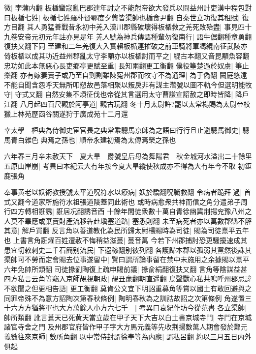 微|{
	孛蒲内翻}
板楯蠻寇亂巴郡連年討之不能尅帝欲大發兵以問益州計吏漢中程包對曰板楯七姓|{
	板楯七姓羅朴督鄂度夕龔皆渠帥也楯食尹翻}
自秦世立功復其租賦|{
	復方目翻}
其人勇猛善戰昔永初中羌入漢川郡縣破壞得板楯救之羌死敗殆盡|{
	事見四十九卷安帝元初元年註亦見是年}
羌人號為神兵傳語種輩勿復南行|{
	語牛倨翻種章勇翻復扶又翻下同}
至建和二年羌復大入實賴板楯連摧破之前車騎將軍馮緄南征武陵亦倚板楯以成其功近益州郡亂太守李顒亦以板楯討而平之|{
	緄古本翻又音昆顒魚容翻}
忠功如此本無惡心長吏鄉亭更賦至重|{
	長知兩翻更工衡翻}
僕役箠楚過於奴虜|{
	箠止橤翻}
亦有嫁妻賣子或乃至自剄割雖陳寃州郡而牧守不為通理|{
	為于偽翻}
闕庭悠遠不能自聞含怨呼天無所叩愬故邑落相聚以叛戾非有謀主濳號以圖不軌今但選明能牧守|{
	守式又翻}
自然安集不煩征伐也帝從其言選用太守曹謙宣詔赦之即時皆降|{
	降戶江翻}
八月起四百尺觀於阿亭道|{
	觀古玩翻}
冬十月太尉許?罷以太常楊賜為太尉帝校獵上林苑歷函谷關遂狩于廣成苑十二月還

幸太學　桓典為侍御史宦官畏之典常乘驄馬京師為之語曰行行且止避驄馬御史|{
	驄馬青白雜色}
典焉之孫也|{
	順帝永建初焉為太傳焉榮之孫也}


六年春三月辛未赦天下　夏大旱　爵號皇后母為舞陽君　秋金城河水溢出二十餘里　五原山岸崩|{
	考異曰本紀云大冇年按今夏大旱縱使秋成亦不得為大冇年今不取}
初鉅鹿張角

奉事黄老以妖術教授號太平道呪符水以療病|{
	妖於驕翻呪職救翻}
令病者跪拜過|{
	首式又翻今道家所施符水祖張道陵蓋同此術也}
或時病愈衆共神而信之角分遣弟子周行四方轉相誑誘|{
	誑居况翻誘音酉}
十餘年間徒衆數十萬自青徐幽冀荆揚兖豫八州之人莫不畢應或棄賣財產流移犇赴塡塞道路|{
	塞悉則翻}
未至病死者亦以萬數郡縣不解其意|{
	解戶買翻}
反言角以善道教化為民所歸太尉楊賜時為司徒|{
	賜為司徒熹平五年也}
上書言角誑燿百姓遭赦不悔稍益滋蔓|{
	蔓音萬}
今若下州郡捕討恐更騷擾速成其患宜切敕刺史二千石簡别流民|{
	下遐稼翻别彼列翻}
各護歸本郡以孤弱其黨然後誅其渠帥可不勞而定會賜去位事遂留中|{
	賢曰謂所論事留在禁中未施用之余據賜以熹平六年免帥所類翻}
司徒掾劉陶復上疏申賜前議|{
	掾俞絹翻復扶又翻}
言角等陰謀益甚四方私言云角等竊入京師覘視朝政|{
	覘丑亷翻朝直遥翻}
鳥聲獸心私共鳴呼州郡忌諱不欲聞之但更相告語|{
	更工衡翻}
莫肯公文宜下明詔重募角等賞以國土有敢回避與之同罪帝殊不為意方詔陶次第春秋條例|{
	陶明春秋為之訓詁故詔之次第條例}
角遂置三十六方方猶將軍也大方萬餘人小方六七千　|{
	考異曰袁紀作坊今從范書}
各立渠帥|{
	帥所類翻}
訛言蒼天已死黄天當立歲在甲子天下大吉以白土書京城寺門|{
	寺門在京城諸官寺舍之門}
及州郡官府皆作甲子字大方馬元義等先收荆揚數萬人期會發於鄴元義數往來京師|{
	數所角翻}
以中常侍封諝徐奉等為内應|{
	諝私呂翻}
約以三月五日内外俱起

